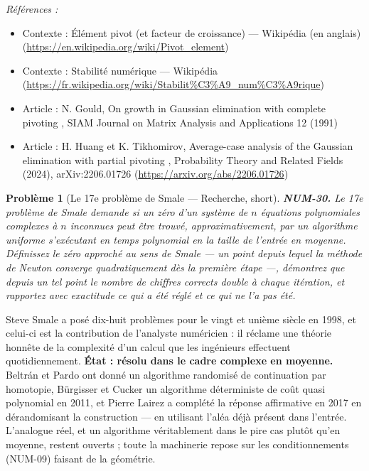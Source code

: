 \documentclass[11pt]{article}
\newtheorem{problem}{Problème}
\newenvironment{refs}{\par\small\noindent\emph{Références :}\begin{itemize}\setlength\itemsep{0pt}}{\end{itemize}\normalsize}
\begin{document}
\begin{refs}
\item Contexte : Élément pivot (et facteur de croissance) --- Wikipédia (en anglais) (\url{https://en.wikipedia.org/wiki/Pivot_element})
\item Contexte : Stabilité numérique --- Wikipédia (\url{https://fr.wikipedia.org/wiki/Stabilit%C3%A9_num%C3%A9rique})
\item Article : N. Gould, \og{} On growth in Gaussian elimination with complete pivoting \fg{}, SIAM Journal on Matrix Analysis and Applications 12 (1991)
\item Article : H. Huang et K. Tikhomirov, \og{} Average-case analysis of the Gaussian elimination with partial pivoting \fg{}, Probability Theory and Related Fields (2024), arXiv:2206.01726 (\url{https://arxiv.org/abs/2206.01726})
\end{refs}

\bigskip

\begin{problem}[{Le 17e problème de Smale --- Recherche, short}]
\textbf{NUM-30.} Le 17e problème de Smale demande si un zéro d'un système de $n$ équations polynomiales complexes à $n$ inconnues peut être trouvé, approximativement, par un algorithme uniforme s'exécutant en temps polynomial en la taille de l'entrée en moyenne. Définissez le \og{} zéro approché \fg{} au sens de Smale --- un point depuis lequel la méthode de Newton converge quadratiquement dès la première étape ---, démontrez que depuis un tel point le nombre de chiffres corrects double à chaque itération, et rapportez avec exactitude ce qui a été réglé et ce qui ne l'a pas été.
\end{problem}

\noindent Steve Smale a posé dix-huit problèmes pour le vingt et unième siècle en 1998, et celui-ci est la contribution de l'analyste numéricien : il réclame une théorie honnête de la complexité d'un calcul que les ingénieurs effectuent quotidiennement. \textbf{État : résolu dans le cadre complexe en moyenne.} Beltrán et Pardo ont donné un algorithme randomisé de continuation par homotopie, Bürgisser et Cucker un algorithme déterministe de coût quasi polynomial en 2011, et Pierre Lairez a complété la réponse affirmative en 2017 en dérandomisant la construction --- en utilisant l'aléa déjà présent dans l'entrée. L'analogue réel, et un algorithme véritablement dans le pire cas plutôt qu'en moyenne, restent ouverts ; toute la machinerie repose sur les conditionnements (NUM-09) faisant de la géométrie.
\end{document}
